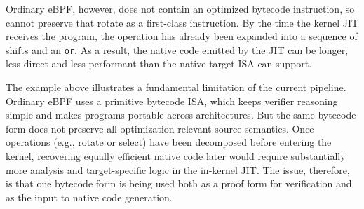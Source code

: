 

Ordinary eBPF, however, does not contain an optimized bytecode instruction, so cannot preserve that rotate as a first-class instruction. By the time the kernel JIT receives the program, the operation has already been expanded into a sequence of shifts and an \texttt{or}. As a result, the native code emitted by the JIT can be longer, less direct and less performant than the native target ISA can support.

The example above illustrates a fundamental limitation of the current pipeline. Ordinary eBPF uses a primitive bytecode ISA, which keeps verifier reasoning simple and makes programs portable across architectures. But the same bytecode form does not preserve all optimization-relevant source semantics. Once operations (e.g., rotate or select) have been decomposed before entering the kernel, recovering equally efficient native code later would require substantially more analysis and target-specific logic in the in-kernel JIT. The issue, therefore, is that one bytecode form is being used both as a proof form for verification and as the input to native code generation.

%

